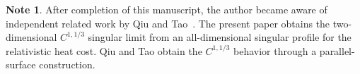 \documentclass[12pt,letterpaper]{amsart}
\theoremstyle{definition}
\newtheorem*{note}{Note}
\theoremstyle{plain}
\numberwithin{equation}{section}
\begin{document}
\begin{note}
After completion of this manuscript, the author became aware of independent related work
by Qiu and Tao~\cite{QT26}. The present paper obtains the two-dimensional
$C^{1,1/3}$ singular limit from an all-dimensional singular profile for the relativistic
heat cost. Qiu and Tao obtain the $C^{1,1/3}$ behavior through a parallel-surface
construction.
\end{note}
\end{document}
